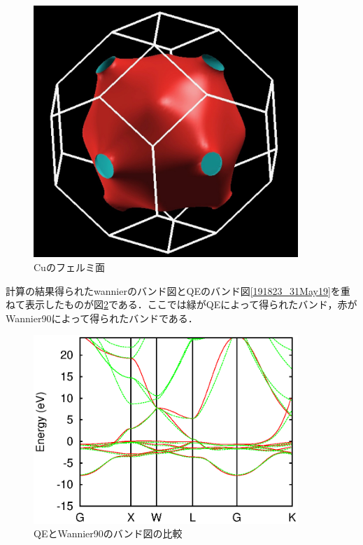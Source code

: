 \documentclass[a4j]{jarticle}
\begin{document}
   \begin{figure}[htb]
     \begin{center}
   \includegraphics[bb=0 0 1111 1057,width=10cm]{fermisurface.jpg}
   \caption{Cuのフェルミ面}
      \label{192331_31May19}
       \end{center}
   \end{figure}


 

 計算の結果得られたwannierのバンド図とQEのバンド図\ref{191823_31May19}を重ねて表示したものが図\ref{195341_31May19}である．ここでは緑がQEによって得られたバンド，赤がWannier90によって得られたバンドである．
\begin{figure}[htb]
 \begin{center}
  \includegraphics[width=10cm]{bandQEW.eps}
  \caption{QEとWannier90のバンド図の比較}
  \label{195341_31May19}
 \end{center}
\end{figure}
\end{document}
